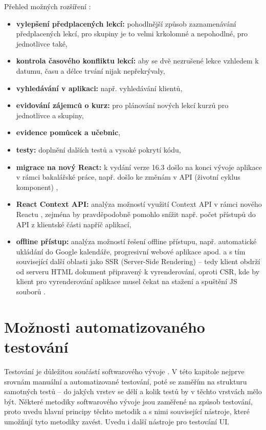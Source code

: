 Přehled možných rozšíření \cite{bp}:
\begin{itemize}
    \item \textbf{vylepšení předplacených lekcí:} pohodlnější způsob zaznamenávání předplacených lekcí, pro skupiny je to velmi krkolomné a nepohodlné, pro jednotlivce také,
    \item \textbf{kontrola časového konfliktu lekcí:} aby se dvě nezrušené lekce vzhledem k datumu, času a délce trvání nijak nepřekrývaly,
    \item \textbf{vyhledávání v aplikaci:} např. vyhledávání klientů,
    \item \textbf{evidování zájemců o kurz:} pro plánování nových lekcí kurzů pro jednotlivce a skupiny,
    \item \textbf{evidence pomůcek a učebnic},
    \item \textbf{testy:} doplnění dalších testů a vysoké pokrytí kódu,
    \item \textbf{migrace na nový React:} k vydání verze 16.3 došlo na konci vývoje aplikace v rámci bakalářské práce, např. došlo ke změnám v API (životní cyklus komponent) \cite{react-blog-163},
    \item \textbf{React Context API:} analýza možností využití Context API v rámci nového Reactu \cite{react-blog-163}, zejména by pravděpodobně pomohlo snížit např. počet přístupů do API z klientské části napříč aplikací,
    \item \textbf{offline přístup:} analýza možností řešení offline přístupu, např. automatické ukládání do Google kalendáře, progresivní webové aplikace apod. a s tím související další oblasti jako SSR (Server-Side Rendering) -- tedy klient obdrží od serveru HTML dokument připravený k vyrenderování, oproti CSR, kde by klient pro vyrenderování aplikace musel čekat na stažení a spuštění JS souborů \cite{csr-ssr}.
\end{itemize}

\chapter{Možnosti automatizovaného testování}

Testování je důležitou součástí softwarového vývoje \cite{test-bdo}. V této kapitole nejprve srovnám manuální a automatizované testování, poté se zaměřím na strukturu samotných testů -- do jakých vrstev se dělí a kolik testů by v těchto vrstvách mělo být. Některé metodiky softwarového vývoje jsou zaměřené na způsob testování, proto uvedu hlavní principy těchto metodik a s nimi související nástroje, které umožňují tyto metodiky zavést. Uvedu i další nástroje pro testování UI.

